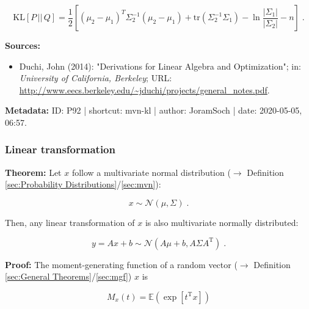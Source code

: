\documentclass[a4paper,12pt,twoside]{book}
\begin{document}
\begin{equation} \label{eq:mvn-kl-mvn-KL-qed}
\mathrm{KL}[P\,||\,Q] = \frac{1}{2} \left[ (\mu_2 - \mu_1)^T \Sigma_2^{-1} (\mu_2 - \mu_1) + \mathrm{tr}(\Sigma_2^{-1} \Sigma_1) - \ln \frac{|\Sigma_1|}{|\Sigma_2|} - n \right] \; .
\end{equation}


\vspace{1em}
\textbf{Sources:}
\begin{itemize}
\item Duchi, John (2014): "Derivations for Linear Algebra and Optimization"; in: \textit{University of California, Berkeley}; URL: \url{http://www.eecs.berkeley.edu/~jduchi/projects/general_notes.pdf}.
\end{itemize}


\vspace{1em}
\textbf{Metadata:} ID: P92 | shortcut: mvn-kl | author: JoramSoch | date: 2020-05-05, 06:57.
\vspace{1em}



\subsubsection[\textbf{Linear transformation}]{Linear transformation} \label{sec:mvn-ltt}
\setcounter{equation}{0}

\textbf{Theorem:} Let $x$ follow a multivariate normal distribution ($\rightarrow$ Definition \ref{sec:Probability Distributions}/\ref{sec:mvn}):

\begin{equation} \label{eq:mvn-ltt-mvn}
x \sim \mathcal{N}(\mu, \Sigma) \; .
\end{equation}

Then, any linear transformation of $x$ is also multivariate normally distributed:

\begin{equation} \label{eq:mvn-ltt-mvn-lt}
y = Ax + b \sim \mathcal{N}(A\mu + b, A \Sigma A^\mathrm{T}) \; .
\end{equation}


\vspace{1em}
\textbf{Proof:} The moment-generating function of a random vector ($\rightarrow$ Definition \ref{sec:General Theorems}/\ref{sec:mgf}) $x$ is

\begin{equation} \label{eq:mvn-ltt-vect-mgf}
M_x(t) = \mathbb{E} \left( \exp \left[ t^\mathrm{T} x \right] \right)
\end{equation}
\end{document}
